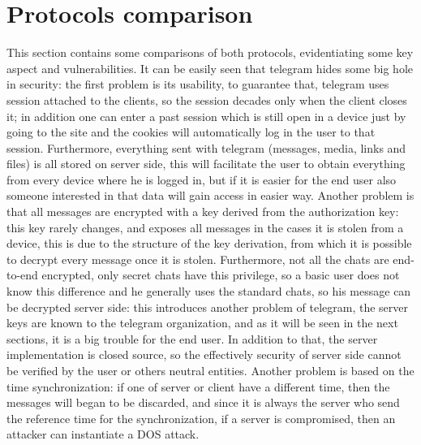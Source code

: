 \documentclass{article}
\begin{document}

\section{Protocols comparison}

This section contains some comparisons of both protocols, evidentiating some key aspect and vulnerabilities. \newline
It can be easily seen that telegram hides some big hole in security: the first problem is its usability, to guarantee that, telegram uses session attached to the clients, so the session decades only when the client closes it; in addition one can enter a past session which is still open in a device just by going to the site and the cookies will automatically log in the user to that session. Furthermore, everything sent with telegram (messages, media, links and files) is all stored on server side, this will facilitate the user to obtain everything from every device where he is logged in, but if it is easier for the end user also someone interested in that data will gain access in easier way. Another problem is that all messages are encrypted with a key derived from the authorization key: this key rarely changes, and exposes all messages in the cases it is stolen from a device, this is due to the structure of the key derivation, from which it is possible to decrypt every message once it is stolen.\newline
Furthermore, not all the chats are end-to-end encrypted, only secret chats have this privilege, so a basic user does not know this difference and he generally uses the standard chats, so his message can be decrypted server side: this introduces another problem of telegram, the server keys are known to the telegram organization, and as it will be seen in the next sections, it is a big trouble for the end user. In addition to that, the server implementation is closed source, so the effectively security of server side cannot be verified by the user or others neutral entities.\newline
Another problem is based on the time synchronization: if one of server or client have a different time, then the messages will began to be discarded, and since it is always the server who send the reference time for the synchronization, if a server is compromised, then an attacker can instantiate a DOS attack.\newline
\end{document}

